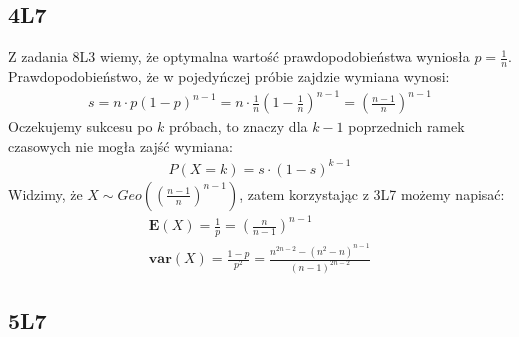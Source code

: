 \documentclass{article}
\begin{document}
\subsection{4L7}

Z zadania 8L3 wiemy, że optymalna wartość prawdopodobieństwa wyniosła $p=\frac{1}{n}$. Prawdopodobieństwo, 
że w pojedyńczej próbie zajdzie wymiana wynosi:
\setcounter{equation}{0}
\begin{align}
    s = n \cdot p (1-p)^{n-1} = n \cdot \frac{1}{n} (1-\frac{1}{n})^{n-1} = \left(\frac{n-1}{n}\right)^{n-1}
\end{align}
Oczekujemy sukcesu po $k$ próbach, to znaczy dla $k-1$ poprzednich ramek czasowych nie mogła zajść wymiana:
\begin{align}
    P(X=k) = s \cdot (1-s)^{k-1}
\end{align}
Widzimy, że $X\sim Geo\left(\left(\frac{n-1}{n}\right)^{n-1}\right)$, zatem korzystając z 3L7 możemy napisać:
\begin{align}
    \mathbf{E}(X) = \frac{1}{p} = \left(\frac{n}{n-1}\right)^{n-1}\\
    \mathbf{var}(X) = \frac{1-p}{p^2} = \frac{n^{2n-2} - \left(n^2-n\right)^{n-1}}{(n-1)^{2n-2}}
\end{align}

\subsection{5L7}
\end{document}
